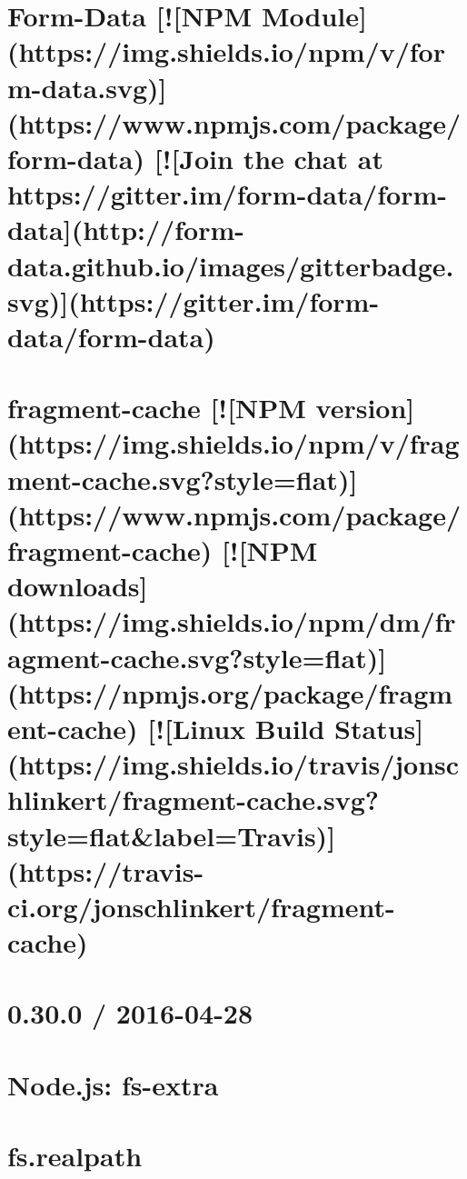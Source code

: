 \documentclass[twoside]{book}
\newcommand{\+}{\discretionary{\mbox{\scriptsize$\hookleftarrow$}}{}{}}
\begin{document}
\chapter{Form-\/\+Data \mbox{[}!\mbox{[}N\+PM Module\mbox{]}(https\+://img.shields.\+io/npm/v/form-\/data.svg)\mbox{]}(https\+://www.npmjs.\+com/package/form-\/data) \mbox{[}!\mbox{[}Join the chat at https\+://gitter.im/form-\/data/form-\/data\mbox{]}(http\+://form-\/data.github.\+io/images/gitterbadge.svg)\mbox{]}(https\+://gitter.im/form-\/data/form-\/data)}
\label{md_dsmacc_vis_degree_node_modules_form-data_README}

\chapter{fragment-\/cache \mbox{[}!\mbox{[}N\+PM version\mbox{]}(https\+://img.shields.\+io/npm/v/fragment-\/cache.svg?style=flat)\mbox{]}(https\+://www.npmjs.\+com/package/fragment-\/cache) \mbox{[}!\mbox{[}N\+PM downloads\mbox{]}(https\+://img.shields.\+io/npm/dm/fragment-\/cache.svg?style=flat)\mbox{]}(https\+://npmjs.org/package/fragment-\/cache) \mbox{[}!\mbox{[}Linux Build Status\mbox{]}(https\+://img.shields.\+io/travis/jonschlinkert/fragment-\/cache.svg?style=flat\&label=Travis)\mbox{]}(https\+://travis-\/ci.org/jonschlinkert/fragment-\/cache)}
\label{md_dsmacc_vis_degree_node_modules_fragment-cache_README}

\chapter{0.30.0 / 2016-\/04-\/28}
\label{md_dsmacc_vis_degree_node_modules_fs-extra_CHANGELOG}

\chapter{Node.\+js\+: fs-\/extra}
\label{md_dsmacc_vis_degree_node_modules_fs-extra_README}

\chapter{fs.\+realpath}
\label{md_dsmacc_vis_degree_node_modules_fs_8realpath_README}

\end{document}
